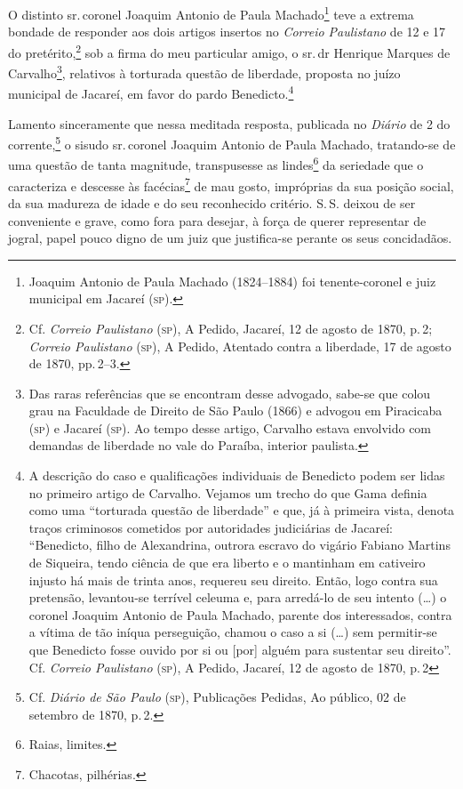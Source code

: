 O distinto sr.\,coronel Joaquim Antonio de Paula Machado\footnote{
  Joaquim Antonio de Paula Machado (1824--1884) foi tenente-coronel e
  juiz municipal em Jacareí (\textsc{sp}).} teve a extrema bondade de responder
aos dois artigos insertos no \emph{Correio Paulistano} de 12 e 17 do
pretérito,\footnote{ Cf. \emph{Correio Paulistano} (\textsc{sp}), A Pedido,
  Jacareí, 12 de agosto de 1870, p.\,2; \emph{Correio Paulistano} (\textsc{sp}), A Pedido,
  Atentado contra a liberdade, 17 de agosto de 1870, pp.\,2--3.} sob a firma do meu
particular amigo, o sr.\,dr Henrique Marques de Carvalho\footnote{ Das
  raras referências que se encontram desse advogado, sabe-se que colou
  grau na Faculdade de Direito de São Paulo (1866) e advogou em
  Piracicaba (\textsc{sp}) e Jacareí (\textsc{sp}). Ao tempo desse artigo, Carvalho estava
  envolvido com demandas de liberdade no vale do Paraíba, interior
  paulista.}, relativos à torturada questão de liberdade, proposta no
juízo municipal de Jacareí, em favor do pardo Benedicto.\footnote{ A
  descrição do caso e qualificações individuais de Benedicto podem ser
  lidas no primeiro artigo de Carvalho. Vejamos um trecho do que Gama
  definia como uma ``torturada questão de liberdade'' e que, já à primeira
  vista, denota traços criminosos cometidos por autoridades judiciárias
  de Jacareí: ``Benedicto, filho de Alexandrina, outrora escravo do
  vigário Fabiano Martins de Siqueira, tendo ciência de que era liberto
  e o mantinham em cativeiro injusto há mais de trinta anos, requereu
  seu direito. Então, logo contra sua pretensão, levantou-se terrível
  celeuma e, para arredá-lo de seu intento (\ldots{}) o coronel Joaquim
  Antonio de Paula Machado, parente dos interessados, contra a vítima de
  tão iníqua perseguição, chamou o caso a si (\ldots{}) sem permitir-se que
  Benedicto fosse ouvido por si ou {[}por{]} alguém para sustentar seu
  direito''. Cf. \emph{Correio Paulistano} (\textsc{sp}), A Pedido, Jacareí,
  12 de agosto de 1870, p.\,2}

Lamento sinceramente que nessa meditada resposta, publicada no
\emph{Diário} de 2 do corrente,\footnote{ Cf. \emph{Diário de São Paulo}
  (\textsc{sp}), Publicações Pedidas, Ao público, 02 de setembro de 1870, p.\,2.} o sisudo sr.\,coronel Joaquim Antonio de Paula Machado, tratando-se de uma questão de
tanta magnitude, transpusesse as lindes\footnote{ Raias, limites.} da
seriedade que o caracteriza e descesse às facécias\footnote{ Chacotas,
  pilhérias.} de mau gosto, impróprias da sua posição social, da sua
madureza de idade e do seu reconhecido critério. S.\,S. deixou de ser
conveniente e grave, como fora para desejar, à força de querer
representar de jogral, papel pouco digno de um juiz que justifica-se
perante os seus concidadãos.

